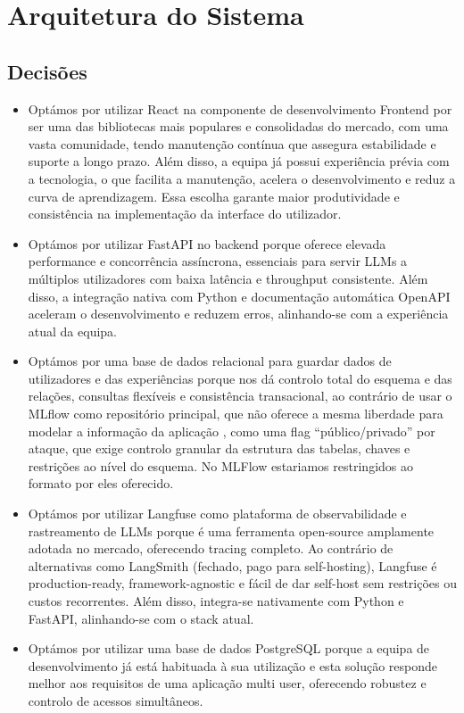 \section{Arquitetura do Sistema}

\subsection{Decisões}
\begin{itemize}
    \item Optámos por utilizar React na componente de desenvolvimento Frontend por ser uma das bibliotecas mais populares e consolidadas do mercado, com uma vasta comunidade, tendo manutenção contínua que assegura estabilidade e suporte a longo prazo. Além disso, a equipa já possui experiência prévia com a tecnologia, o que facilita a manutenção, acelera o desenvolvimento e reduz a curva de aprendizagem. Essa escolha garante maior produtividade e consistência na implementação da interface do utilizador.
    \item Optámos por utilizar FastAPI no backend porque oferece elevada performance e concorrência assíncrona, essenciais para servir LLMs a múltiplos utilizadores com baixa latência e throughput consistente. Além disso, a integração nativa com Python e documentação automática OpenAPI aceleram o desenvolvimento e reduzem erros, alinhando-se com a experiência atual da equipa.
    \item Optámos por uma base de dados relacional para guardar dados de utilizadores e das experiências porque nos dá controlo total do esquema e das relações, consultas flexíveis e consistência transacional, ao contrário de usar o MLflow como repositório principal, que não oferece a mesma liberdade para modelar a informação da aplicação , como uma flag “público/privado” por ataque, que exige controlo granular da estrutura das tabelas, chaves e restrições ao nível do esquema. No MLFlow estariamos restringidos ao formato por eles oferecido.
    \item Optámos por utilizar Langfuse como plataforma de observabilidade e rastreamento de LLMs porque é uma ferramenta open-source amplamente adotada no mercado, oferecendo tracing completo. Ao contrário de alternativas como LangSmith (fechado, pago para self-hosting), Langfuse é production-ready, framework-agnostic e fácil de dar self-host sem restrições ou custos recorrentes. Além disso, integra-se nativamente com Python e FastAPI, alinhando-se com o stack atual.

    \item Optámos por utilizar uma base de dados PostgreSQL porque a equipa de desenvolvimento já está habituada à sua utilização e esta solução responde melhor aos requisitos de uma aplicação multi user, oferecendo robustez e controlo de acessos simultâneos.
\end{itemize}
